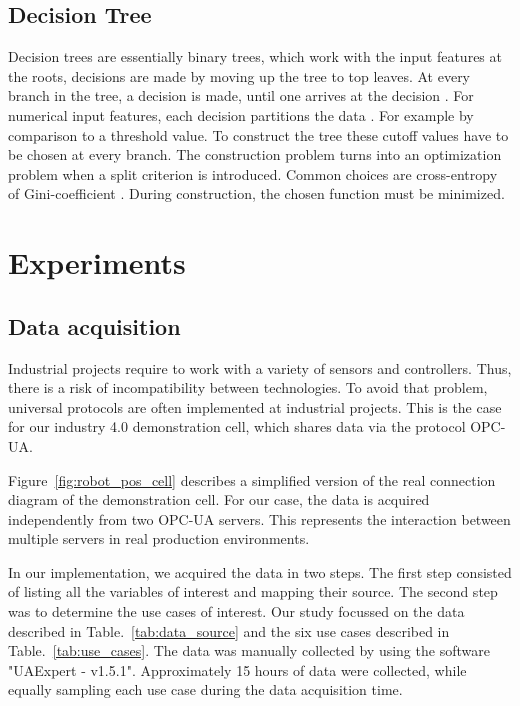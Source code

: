 \documentclass[5p,times,procedia]{elsarticle}
\begin{document}
\subsection{Decision Tree}
Decision trees are essentially binary trees, which work with the input
features at the roots, decisions are made by moving
up the tree to top leaves. At every branch in the tree, a decision
is made, until one arrives at the decision \cite{Marsland2015Machine}.
For numerical input features, each decision partitions the data
\cite{aggarwal2015data}. For example by comparison to a threshold value.
To construct the tree these cutoff values have to be chosen at every branch. The construction problem turns into an optimization problem when a split criterion is introduced. Common choices are cross-entropy of Gini-coefficient \cite{aggarwal2015data}.
During construction, the chosen function must be minimized. 


\section{Experiments} \label{sec:experiment}

\subsection{Data acquisition}

Industrial projects require to work with a variety of sensors and controllers. Thus, there is a risk of incompatibility between technologies. To avoid that problem, universal protocols are often implemented at industrial projects. This is the case for our industry 4.0 demonstration cell, which shares data via the protocol OPC-UA. 

Figure~\ref{fig:robot_pos_cell} describes a simplified version of the real connection diagram of the demonstration cell. For our case, the data is acquired independently from two OPC-UA servers. This represents the interaction between multiple servers in real production environments. 

In our implementation, we acquired the data in two steps.
The first step consisted of listing all the variables of interest and mapping their source. The second step was to determine the use cases of interest. Our study focussed on the data described in Table.~\ref{tab:data_source} and the six use cases described in Table.~\ref{tab:use_cases}. The data was manually collected by using the software "UAExpert - v1.5.1". Approximately 15 hours of data were collected, while equally sampling each use case during the data acquisition time.
\end{document}
